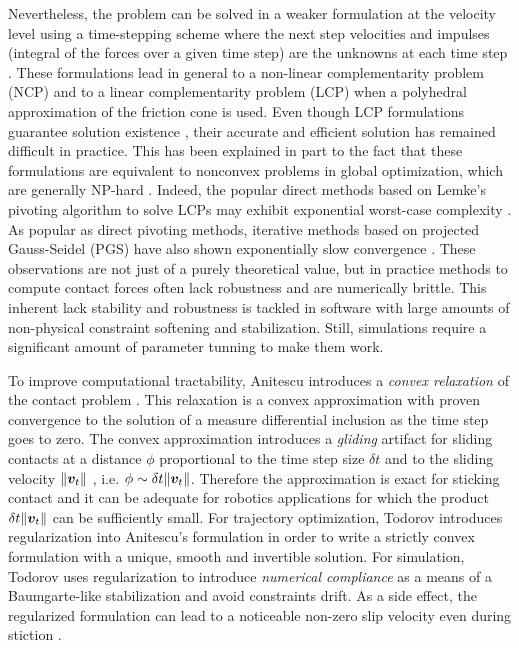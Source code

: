 Nevertheless, the problem can be solved in a weaker formulation at the velocity
level using a time-stepping scheme where the next step velocities and impulses
(integral of the forces over a given time step) are the unknowns at each time
step \cite{bib:stewart1996implicit, bib:anitescu1997}. These formulations lead
in general to a non-linear complementarity problem (NCP) and to a linear
complementarity problem (LCP) when a polyhedral approximation of the friction
cone is used. Even though LCP formulations guarantee solution existence
\cite{bib:anitescu1997, bib:stewart1998convergence}, their accurate and
efficient solution has remained difficult in practice. This has been explained
in part to the fact that these formulations are equivalent to nonconvex problems
in global optimization, which are generally NP-hard \cite{bib:Kaufman2008}.
Indeed, the popular direct methods based on Lemke's pivoting algorithm to solve
LCPs may exhibit exponential worst-case complexity \cite{bib:baraff1994fast}. As
popular as direct pivoting methods, iterative methods based on projected
Gauss-Seidel (PGS) \cite{bib:duriez2006_realistic_haptic_rendering, bib:bullet}
have also shown exponentially slow convergence \cite{bib:erleben2007velocity}.
These observations are not just of a purely theoretical value, but in practice
methods to compute contact forces often lack robustness and are numerically
brittle. This inherent lack stability and robustness is tackled in software with
large amounts of non-physical constraint softening and stabilization. Still,
simulations require a significant amount of parameter tunning to make them work.

To improve computational tractability, Anitescu introduces a \textit{convex
relaxation} of the contact problem \cite{bib:anitescu2006}. This relaxation is a
convex approximation with proven convergence to the solution of a measure
differential inclusion as the time step goes to zero. The convex approximation
introduces a \emph{gliding} artifact for sliding contacts at a distance $\phi$
proportional to the time step size $\delta t$ and to the sliding velocity
$\Vert{\bm{v}}_t\Vert$ \cite{bib:mazhar2014}, i.e. $\phi\sim \delta
t\Vert{\bm{v}}_t\Vert$. Therefore the approximation is exact for sticking contact
and it can be adequate for robotics applications for which the product $\delta
t\Vert{\bm{v}}_t\Vert$ can be sufficiently small. For trajectory optimization,
Todorov \cite{bib:todorov2011} introduces regularization into Anitescu's
formulation in order to write a strictly convex formulation with a unique,
smooth and invertible solution. For simulation, Todorov \cite{bib:todorov2014}
uses regularization to introduce \emph{numerical compliance} as a means of a
Baumgarte-like stabilization and avoid constraints drift. As a side effect, the
regularized formulation can lead to a noticeable non-zero slip velocity even
during stiction \cite{bib:simbenchmark}.

